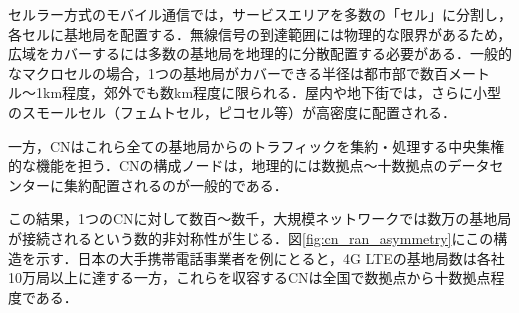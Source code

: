 セルラー方式のモバイル通信では，サービスエリアを多数の「セル」に分割し，各セルに基地局を配置する．無線信号の到達範囲には物理的な限界があるため，広域をカバーするには多数の基地局を地理的に分散配置する必要がある．一般的なマクロセルの場合，1つの基地局がカバーできる半径は都市部で数百メートル〜1km程度，郊外でも数km程度に限られる．屋内や地下街では，さらに小型のスモールセル（フェムトセル，ピコセル等）が高密度に配置される．

一方，CNはこれら全ての基地局からのトラフィックを集約・処理する中央集権的な機能を担う．CNの構成ノードは，地理的には数拠点〜十数拠点のデータセンターに集約配置されるのが一般的である．

この結果，1つのCNに対して数百〜数千，大規模ネットワークでは数万の基地局が接続されるという数的非対称性が生じる．図\ref{fig:cn_ran_asymmetry}にこの構造を示す．日本の大手携帯電話事業者を例にとると，4G LTEの基地局数は各社10万局以上に達する\cite{MIC_Infra_Report_R05}一方，これらを収容するCNは全国で数拠点から十数拠点程度である．

